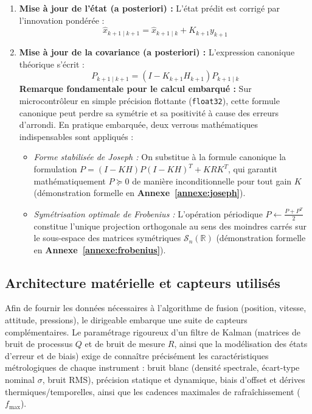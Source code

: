 \documentclass[../Formulations_Kalman.tex]{subfiles}
\begin{document}
\begin{enumerate}
    \item \textbf{Mise à jour de l'état (a posteriori) :}
    L'état prédit est corrigé par l'innovation pondérée :
    \begin{equation}
    \hat{x}_{k+1\mid k+1} = \hat{x}_{k+1\mid k} + K_{k+1} y_{k+1}
    \end{equation}

    \item \textbf{Mise à jour de la covariance (a posteriori) :}
    L'expression canonique théorique s'écrit :
    \begin{equation}
    P_{k+1\mid k+1} = (I - K_{k+1} H_{k+1}) P_{k+1\mid k}
    \end{equation}
    \textbf{Remarque fondamentale pour le calcul embarqué :}
    Sur microcontrôleur en simple précision flottante (\texttt{float32}), cette formule canonique peut perdre sa symétrie et sa positivité à cause des erreurs d'arrondi. En pratique embarquée, deux verrous mathématiques indispensables sont appliqués :
    \begin{itemize}
        \item \textit{Forme stabilisée de Joseph :} On substitue à la formule canonique la formulation $P = (I-KH)P(I-KH)^T + KRK^T$, qui garantit mathématiquement $P \succeq 0$ de manière inconditionnelle pour tout gain $K$ (démonstration formelle en \textbf{Annexe~\ref{annexe:joseph}}).
        \item \textit{Symétrisation optimale de Frobenius :} L'opération périodique $P \leftarrow \frac{P + P^T}{2}$ constitue l'unique projection orthogonale au sens des moindres carrés sur le sous-espace des matrices symétriques $\mathcal{S}_n(\mathbb{R})$ (démonstration formelle en \textbf{Annexe~\ref{annexe:frobenius}}).
    \end{itemize}
\end{enumerate}

\subsection{Architecture matérielle et capteurs utilisés}
Afin de fournir les données nécessaires à l'algorithme de fusion (position, vitesse, attitude, pressions), le dirigeable embarque une suite de capteurs complémentaires. Le paramétrage rigoureux d'un filtre de Kalman (matrices de bruit de processus $Q$ et de bruit de mesure $R$, ainsi que la modélisation des états d'erreur et de biais) exige de connaître précisément les caractéristiques métrologiques de chaque instrument : bruit blanc (densité spectrale, écart-type nominal $\sigma$, bruit RMS), précision statique et dynamique, biais d'offset et dérives thermiques/temporelles, ainsi que les cadences maximales de rafraîchissement ($f_{\max}$).
\end{document}
